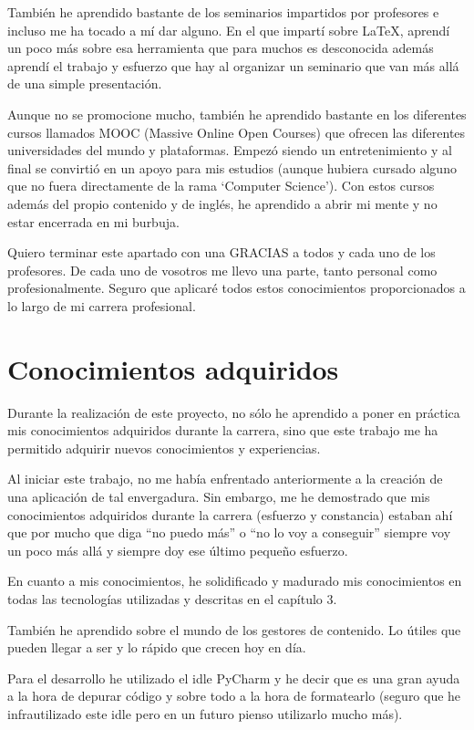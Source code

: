 También he aprendido bastante de los seminarios impartidos por profesores e incluso me ha tocado a mí dar alguno. En el que impartí sobre LaTeX, aprendí un poco más sobre esa herramienta que para muchos es desconocida además aprendí el trabajo y esfuerzo que hay al organizar un seminario que van más allá de una simple presentación.


Aunque no se promocione mucho, también he aprendido bastante en los diferentes cursos llamados MOOC (Massive Online Open Courses) que ofrecen las diferentes universidades del mundo y plataformas. Empezó siendo un entretenimiento y al final se convirtió en un apoyo para mis estudios (aunque hubiera cursado alguno que no fuera directamente de la rama ‘Computer Science’). Con estos cursos además del propio contenido y de inglés, he aprendido a abrir mi mente y no estar encerrada en mi burbuja.


Quiero terminar este apartado con una GRACIAS a todos y cada uno de los profesores. De cada uno de vosotros me llevo una parte, tanto personal como profesionalmente. Seguro que aplicaré todos estos conocimientos proporcionados a lo largo de mi carrera profesional.



\section{Conocimientos adquiridos} 
\label{sec:adquiridos}

Durante la realización de este proyecto, no sólo he aprendido a poner en práctica mis conocimientos adquiridos durante la carrera, sino que este trabajo me ha permitido adquirir nuevos conocimientos y experiencias.


Al iniciar este trabajo, no me había enfrentado anteriormente a la creación de una aplicación de tal envergadura. Sin embargo, me he demostrado que mis conocimientos adquiridos durante la carrera (esfuerzo y constancia) estaban ahí que por mucho que diga “no puedo más” o “no lo voy a conseguir” siempre voy un poco más allá y siempre doy ese último pequeño esfuerzo.


En cuanto a mis conocimientos, he solidificado y madurado mis conocimientos en todas las tecnologías utilizadas y descritas en el capítulo 3.


También he aprendido sobre el mundo de los gestores de contenido. Lo útiles que pueden llegar a ser y lo rápido que crecen hoy en día.


Para el desarrollo he utilizado el idle PyCharm y he decir que es una gran ayuda a la hora de depurar código y sobre todo a la hora de formatearlo (seguro que he infrautilizado este idle pero en un futuro pienso utilizarlo mucho más).


